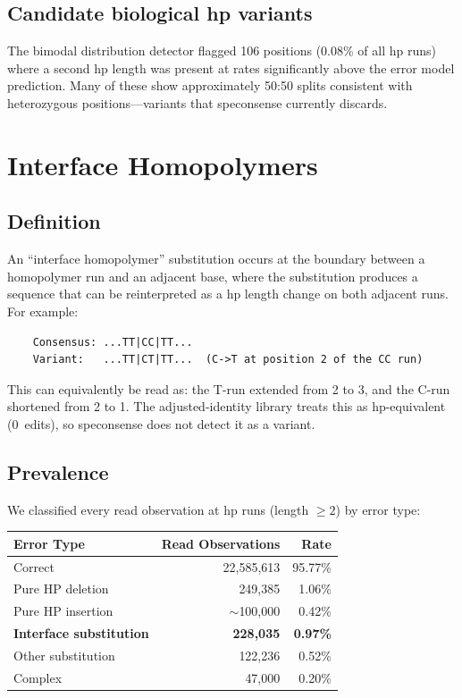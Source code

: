 \documentclass[11pt]{article}
\begin{document}
\subsection{Candidate biological hp variants}

The bimodal distribution detector flagged 106 positions (0.08\% of all hp runs)
where a second hp length was present at rates significantly above the error
model prediction. Many of these show approximately 50:50 splits consistent with
heterozygous positions---variants that speconsense currently discards.


\section{Interface Homopolymers}
\label{sec:interface}

\subsection{Definition}

An ``interface homopolymer'' substitution occurs at the boundary between a
homopolymer run and an adjacent base, where the substitution produces a
sequence that can be reinterpreted as a hp length change on both adjacent runs.
For example:

\begin{verbatim}
    Consensus: ...TT|CC|TT...
    Variant:   ...TT|CT|TT...  (C->T at position 2 of the CC run)
\end{verbatim}

This can equivalently be read as: the T-run extended from 2 to 3, and the
C-run shortened from 2 to 1. The adjusted-identity library treats this as
hp-equivalent (0~edits), so speconsense does not detect it as a variant.

\subsection{Prevalence}

We classified every read observation at hp runs (length $\geq 2$) by error
type:

\begin{table}[h]
\centering
\begin{tabular}{lrr}
\toprule
Error Type & Read Observations & Rate \\
\midrule
Correct & 22,585,613 & 95.77\% \\
Pure HP deletion & 249,385 & 1.06\% \\
Pure HP insertion & ${\sim}$100,000 & 0.42\% \\
\textbf{Interface substitution} & \textbf{228,035} & \textbf{0.97\%} \\
Other substitution & 122,236 & 0.52\% \\
Complex & 47,000 & 0.20\% \\
\bottomrule
\end{tabular}
\end{table}
\end{document}
